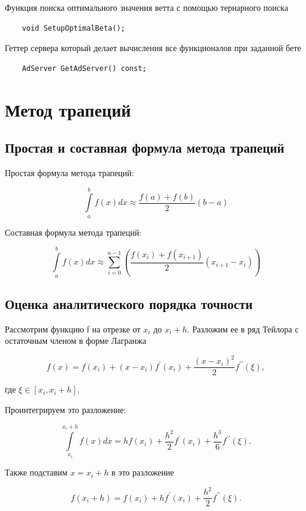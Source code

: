 \documentclass{article}
\theoremstyle{definition}
\theoremstyle{remark}
\newcommand{\lfrac} [2] {\displaystyle \frac{#1}{#2}}
\begin{document}
Функция поиска оптимального значения ветта с помощью тернарного поиска

\begin{lstlisting}
	void SetupOptimalBeta();
\end{lstlisting}

Геттер сервера который делает вычисления все функционалов при заданной бете

\begin{lstlisting}
	AdServer GetAdServer() const;
\end{lstlisting}




\section{Метод трапеций}

\subsection{Простая и составная формула метода трапеций}

Простая формула метода трапеций:

$$
\int \limits_{a}^{b} f(x) dx \approx \lfrac{f(a) + f(b)}{2}(b - a)
$$

Составная формула метода трапеций:

$$
\int \limits_{a}^{b} f(x) dx \approx \sum \limits_{i = 0}^{n - 1} \left( \lfrac{f(x_i) + f(x_{i + 1})}{2} (x_{i + 1} - x_i)\right)
$$

\subsection{Оценка аналитического порядка точности}

Рассмотрим функцию f на отрезке от $x_i$ до $x_i + h$. Разложим ее в ряд Тейлора с остаточным членом в форме Лагранжа

$$
f(x) = f(x_i) + (x - x_i) f^\prime(x_i) + \lfrac{(x - x_i)^2}{2}f^{\prime\prime}(\xi),
$$

где $\xi \in [x_i, x_i + h]$.

Проинтегрируем это разложение:

$$
\int\limits_{x_i}^{x_i + h} f(x) dx = h  f(x_i) + \lfrac{h^2}{2} f^\prime(x_i) + \lfrac{h^3}{6} f^{\prime\prime}(\xi).
$$

Также подставим $x = x_i + h$ в это разложение

$$
f(x_i + h) = f(x_i) + h f^{\prime}(x_i) + \lfrac{h^2}{2}f^{\prime\prime}(\xi).
$$
\end{document}
